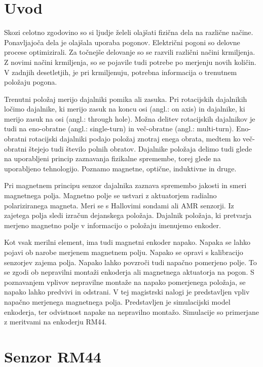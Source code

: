 \chapter{Uvod} \label{uvod}

Skozi celotno zgodovino so si ljudje želeli olajšati fizična dela na različne načine. Ponavljajoča dela je olajšala uporaba pogonov. Električni pogoni so delovne procese optimizirali. Za točnejše delovanje so se razvili različni načini krmiljenja. Z novimi načini krmiljenja, so se pojavile tudi potrebe po merjenju novih količin. V zadnjih desetletjih, je pri krmiljenuju, potrebna informacija o trenutnem položaju pogona.

Trenutni položaj merijo dajalniki pomika ali zasuka\cite{uporabaSenzorjev}. Pri rotacijskih dajalnikih ločimo dajalnike, ki merijo zasuk na koncu osi (angl.: on axis) in dajalnike, ki merijo zasuk na osi (angl.: through hole). Možna delitev rotacijskih dajalnikov je tudi na eno-obratne (angl.: single-turn) in več-obratne (angl.: multi-turn). Eno-obratni rotacijski dajalniki podajo položaj znotraj enega obrata, medtem ko več-obratni štejejo tudi število polnih obratov. Dajalnike položaja delimo tudi glede na uporabljeni princip zaznavanja fizikalne
spremembe, torej glede na uporabljeno tehnologijo. Poznamo magnetne, optične,
induktivne in druge\cite{killer}.

Pri magnetnem principu senzor dajalnika zaznava spremembo jakosti in smeri
magnetnega polja. 
Magnetno polje se ustvari z aktuatorjem radialno polariziranega magneta. Meri se s Hallovimi sondami ali AMR senzorji. Iz zajetega polja sledi izračun dejanskega položaja. Dajalnik položaja, ki pretvarja merjeno magnetno polje v informacijo o položaju imenujemo enkoder\cite{enkoder}.

Kot vsak merilni element, ima tudi magnetni enkoder napako. Napaka se lahko pojavi ob narobe merjenem magnetnem polju\cite{RLS3}. Napako se opravi s kalibracijo senzorjev zajema polja. Napako lahko povzroči tudi napačno pomerjeno polje. To se zgodi ob nepravilni montaži enkoderja ali magnetnega aktuatorja na pogon. S poznavanjem vplivov nepravilne montaže na napako pomerjenega položaja, se napako lahko predvivi in odstrani.
V tej magistrski nalogi je predstavljen vpliv napačno merjenega magnetnega polja. Predstavljen je simulacijski model enkoderja, ter odvistnost napake na nepravilno montažo. Simulacije so primerjane z meritvami na enkoderju RM44\cite{RM44}.


\chapter{Senzor RM44}

